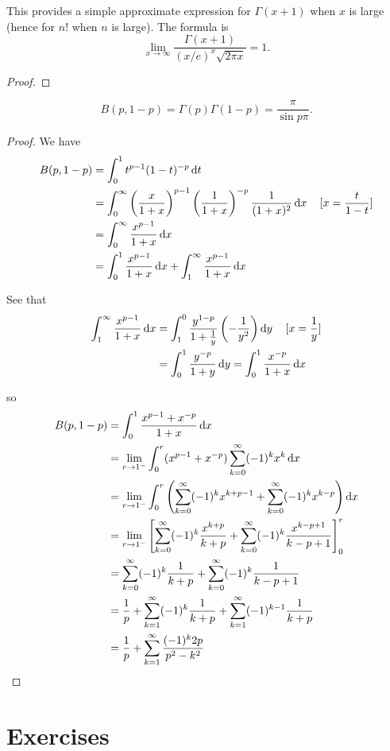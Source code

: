 \begin{theorem}
This provides a simple approximate expression for $\Gamma(x+1)$ when $x$ is large (hence for $n!$ when $n$ is large). The formula is
\begin{equation}
\lim_{x\to\infty}\frac{\Gamma(x+1)}{(x/e)^x\sqrt{2\pi x}}=1.
\end{equation}
\end{theorem}

\begin{proof}

\end{proof}

\begin{lemma}
\[B(p,1-p)=\Gamma(p)\Gamma(1-p)=\frac{\pi}{\sin p\pi}.\]
\end{lemma}

\begin{proof}
We have
\begin{align*}
B(p,1-p)
&=\int_{0}^{1}t^{p-1}(1-t)^{-p}\dd{t}\\
&=\int_{0}^{\infty}\left(\frac{x}{1+x}\right)^{p-1}\left(\frac{1}{1+x}\right)^{-p}\frac{1}{(1+x)^2}\dd{x}\quad[x=\frac{t}{1-t}]\\
&=\int_{0}^{\infty}\frac{x^{p-1}}{1+x}\dd{x}\\
&=\int_{0}^{1}\frac{x^{p-1}}{1+x}\dd{x}+\int_{1}^{\infty}\frac{x^{p-1}}{1+x}\dd{x}
\end{align*}

See that
\begin{align*}
\int_{1}^{\infty}\frac{x^{p-1}}{1+x}\dd{x}
&=\int_{1}^{0}\frac{y^{1-p}}{1+\frac{1}{y}}\left(-\frac{1}{y^2}\right)\dd{y}\quad[x=\frac{1}{y}]\\
&=\int_{0}^{1}\frac{y^{-p}}{1+y}\dd{y}=\int_{0}^{1}\frac{x^{-p}}{1+x}\dd{x}
\end{align*}

so
\begin{align*}
B(p,1-p)
&=\int_{0}^{1}\frac{x^{p-1}+x^{-p}}{1+x}\dd{x}\\
&=\lim_{r\to1^-}\int_{0}^{r}(x^{p-1}+x^{-p})\sum_{k=0}^{\infty}(-1)^k x^k\dd{x}\\
&=\lim_{r\to1^-}\int_{0}^{r}\left(\sum_{k=0}^{\infty}(-1)^k x^{k+p-1}+\sum_{k=0}^{\infty}(-1)^k x^{k-p}\right)\dd{x}\\
&=\lim_{r\to1^-}\left[\sum_{k=0}^{\infty}(-1)^k\frac{x^{k+p}}{k+p}+\sum_{k=0}^{\infty}(-1)^k\frac{x^{k-p+1}}{k-p+1}\right]_0^r\\
&=\sum_{k=0}^{\infty}(-1)^k\frac{1}{k+p}+\sum_{k=0}^{\infty}(-1)^k\frac{1}{k-p+1}\\
&=\frac{1}{p}+\sum_{k=1}^{\infty}(-1)^k\frac{1}{k+p}+\sum_{k=1}^{\infty}(-1)^{k-1}\frac{1}{k+p}\\
&=\frac{1}{p}+\sum_{k=1}^{\infty}\frac{(-1)^k 2p}{p^2-k^2}
\end{align*}
\end{proof}
\pagebreak

\section*{Exercises}
